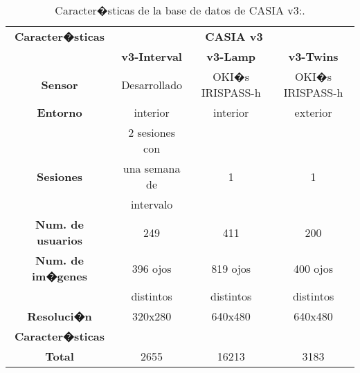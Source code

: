 \begin{table}[h]
    \centering
    \scriptsize
    \begin{tabular}{|c|c|c|c|}
        \hline
        \textbf{Caracter�sticas}   & \multicolumn{3}{|c|}{\textbf{CASIA v3}}            \\
        \cline{2-4}
                                   & \textbf{v3-Interval}   & \textbf{v3-Lamp}  & \textbf{v3-Twins}         \\
        \hline
        \textbf{Sensor}            & Desarrollado           & OKI�s IRISPASS-h  & OKI�s IRISPASS-h \\
        \hline
        \textbf{Entorno}           & interior               & interior          & exterior         \\
        \hline
                                   & 2 sesiones con         &                   &           \\
        \textbf{Sesiones}          & una semana de          & 1                 & 1         \\
                                   & intervalo              &                   &           \\
        \hline
        \textbf{Num. de usuarios}  & 249                    & 411               & 200       \\
        \hline
        \textbf{Num. de im�genes}  & 396 ojos               & 819 ojos          & 400 ojos   \\
                                   & distintos              & distintos         & distintos  \\
        \hline
        \textbf{Resoluci�n}        & 320x280                & 640x480           & 640x480    \\
        \hline
        \textbf{Caracter�sticas}   &                        &                   &           \\
        \hline
        \textbf{Total}             & 2655                   & 16213             & 3183      \\
        \hline
    \end{tabular}
    \caption{Caracter�sticas de la base de datos de CASIA v3:\citet{database:CASIA_web}.}
    \label{table:info_CASIAv3}
\end{table}


